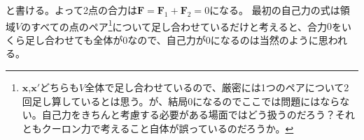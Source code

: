 \documentclass[a4j,12pt,uplatex,dvipdfmx]{jsreport}
\begin{document}
と書ける。よって2点の合力は$\bm{F} = \bm{F}_1 + \bm{F}_2 = 0$になる。
最初の自己力の式は領域$V$のすべての点のペア\footnote{$\bm{x}$,$\bm{x'}$どちらも$V$全体で足し合わせているので、厳密には1つのペアについて2回足し算しているとは思う。が、結局$0$になるのでここでは問題にはならない。自己力をきちんと考慮する必要がある場面ではどう扱うのだろう？それともクーロン力で考えること自体が誤っているのだろうか。}について足し合わせているだけと考えると、合力$0$をいくら足し合わせても全体が$0$なので、自己力が$0$になるのは当然のように思われる。
\end{document}
